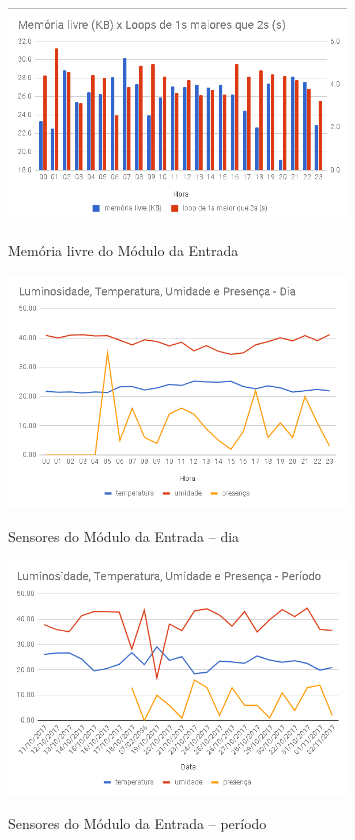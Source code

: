 \begin{figure}[H]
	\centering
	\caption{Memória livre do Módulo da Entrada}
	\includegraphics[width=0.8\textwidth]{memLivreEntrada}
	\label{fig:memLivreEntrada}
\end{figure}

\begin{figure}[H]
	\centering
	\caption{Sensores do Módulo da Entrada -- dia}
	\includegraphics[width=0.8\textwidth]{sensoresEntradaDia}
	\label{fig:sensoresEntradaDia}
\end{figure}

\begin{figure}[H]
	\centering
	\caption{Sensores do Módulo da Entrada -- período}
	\includegraphics[width=0.8\textwidth]{sensoresEntradaPeriodo}
	\label{fig:sensoresEntradaPeriodo}
\end{figure}

